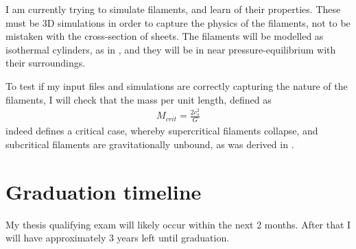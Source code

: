 \documentclass{article}
\begin{document}
I am currently trying to simulate filaments, and learn of their properties. These must be 3D simulations in order to capture the physics of the filaments, not to be mistaken with the cross-section of sheets. The filaments will be modelled as isothermal cylinders, as in \cite{im97}, and they will be in near pressure-equilibrium with their surroundings.

To test if my input files and simulations are correctly capturing the nature of the filaments, I will check that the mass per unit length, defined as \begin{align}
M_{crit} = \frac{2c_s^2}{G}
\end{align} indeed defines a critical case, whereby supercritical filaments collapse, and subcritical filaments are gravitationally unbound, as was derived in \cite{im92}.





\section{Graduation timeline}


My thesis qualifying exam will likely occur within the next 2 months. After that I will have approximately 3 years left until graduation.




\end{document}
